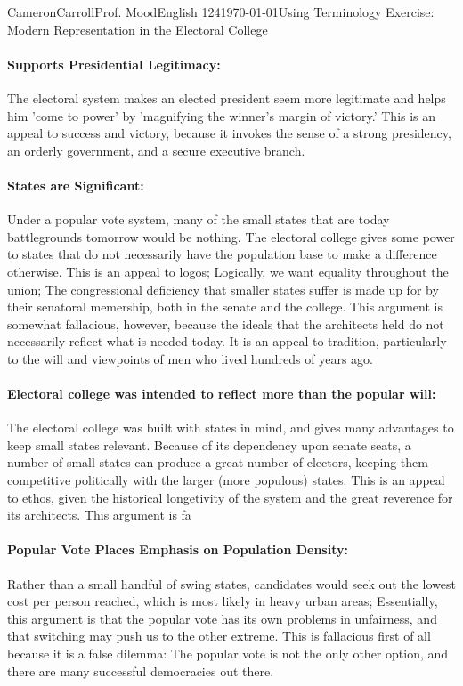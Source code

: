 \documentclass[12pt,letterpaper]{article}
\begin{document}
\begin{mla}{Cameron}{Carroll}{Prof. Mood}{English 124}{\today}{Using Terminology Exercise: Modern Representation in the Electoral College}
\paragraph{Supports Presidential Legitimacy:}
The electoral system makes an elected president seem more legitimate and helps him 'come to power' by 'magnifying the winner's margin of victory.' This is an appeal to success and victory, because it invokes the sense of a strong presidency, an orderly government, and a secure executive branch.

\paragraph{States are Significant:}
Under a popular vote system, many of the small states that are today battlegrounds tomorrow would be nothing. The electoral college gives some power to states that do not necessarily have the population base to make a difference otherwise. This is an appeal to logos; Logically, we want equality throughout the union; The congressional deficiency that smaller states suffer is made up for by their senatoral memership, both in the senate and the college. This argument is somewhat fallacious, however, because the ideals that the architects held do not necessarily reflect what is needed today. It is an appeal to tradition, particularly to the will and viewpoints of men who lived hundreds of years ago.

\paragraph{Electoral college was intended to reflect more than the popular will:}
The electoral college was built with states in mind, and gives many advantages to keep small states relevant. Because of its dependency upon senate seats, a number of small states can produce a great number of electors, keeping them competitive politically with the larger (more populous) states. This is an appeal to ethos, given the historical longetivity of the system and the great reverence for its architects. This argument is fa                                 

\paragraph{Popular Vote Places Emphasis on Population Density:}
Rather than a small handful of swing states, candidates would seek out the lowest cost per person reached, which is most likely in heavy urban areas; Essentially, this argument is that the popular vote has its own problems in unfairness, and that switching may push us to the other extreme. This is fallacious first of all because it is a false dilemma: The popular vote is not the only other option, and there are many successful democracies out there. 


\end{mla}
\end{document}
